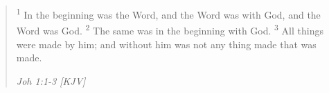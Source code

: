 \begin{quote}
\textsuperscript{1} In the beginning was the Word, and the Word was with God, and the Word was God.
\textsuperscript{2} The same was in the beginning with God.
\textsuperscript{3} All things were made by him; and without him was not any thing made that was made.
\begin{flushright}
\emph{Joh 1:1-3 [KJV]}
\end{flushright}
\end{quote}